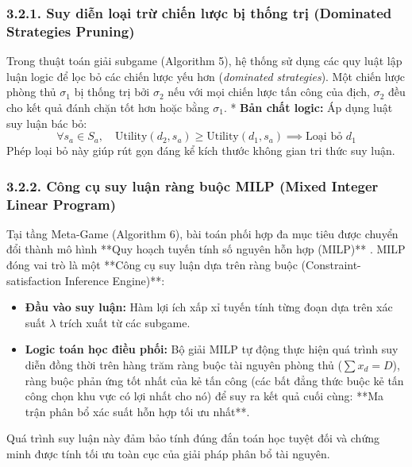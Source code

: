 \documentclass[../main.tex]{subfiles}
\begin{document}
\subsubsection{3.2.1. Suy diễn loại trừ chiến lược bị thống trị (Dominated Strategies Pruning)}
Trong thuật toán giải subgame (Algorithm 5), hệ thống sử dụng các quy luật lập luận logic để lọc bỏ các chiến lược yếu hơn (\textit{dominated strategies}). Một chiến lược phòng thủ $\sigma_1$ bị thống trị bởi $\sigma_2$ nếu với mọi chiến lược tấn công của địch, $\sigma_2$ đều cho kết quả đánh chặn tốt hơn hoặc bằng $\sigma_1$. 
* \textbf{Bản chất logic:} Áp dụng luật suy luận bác bỏ: 
\begin{equation}
    \forall s_a \in S_a, \quad \text{Utility}(d_2, s_a) \ge \text{Utility}(d_1, s_a) \implies \text{Loại bỏ } d_1
\end{equation}
Phép loại bỏ này giúp rút gọn đáng kể kích thước không gian tri thức suy luận.

\subsubsection{3.2.2. Công cụ suy luận ràng buộc MILP (Mixed Integer Linear Program)}
Tại tầng Meta-Game (Algorithm 6), bài toán phối hợp đa mục tiêu được chuyển đổi thành mô hình **Quy hoạch tuyến tính số nguyên hỗn hợp (MILP)** \cite{mutzari2025defending}. MILP đóng vai trò là một **Công cụ suy luận dựa trên ràng buộc (Constraint-satisfaction Inference Engine)**:
\begin{itemize}
    \item \textbf{Đầu vào suy luận:} Hàm lợi ích xấp xỉ tuyến tính từng đoạn dựa trên xác suất $\lambda$ trích xuất từ các subgame.
    \item \textbf{Logic toán học điều phối:} Bộ giải MILP tự động thực hiện quá trình suy diễn đồng thời trên hàng trăm ràng buộc tài nguyên phòng thủ ($\sum x_d = D$), ràng buộc phản ứng tốt nhất của kẻ tấn công (các bất đẳng thức buộc kẻ tấn công chọn khu vực có lợi nhất cho nó) để suy ra kết quả cuối cùng: **Ma trận phân bổ xác suất hỗn hợp tối ưu nhất**.
\end{itemize}
Quá trình suy luận này đảm bảo tính đúng đắn toán học tuyệt đối và chứng minh được tính tối ưu toàn cục của giải pháp phân bổ tài nguyên.
\end{document}
